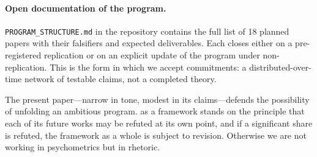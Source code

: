\paragraph{Open documentation of the program.} \texttt{PROGRAM\_STRUCTURE.md} in the repository contains the full list of 18 planned papers with their falsifiers and expected deliverables. Each closes either on a pre-registered replication or on an explicit update of the program under non-replication. This is the form in which we accept commitments: a distributed-over-time network of testable claims, not a completed theory.

The present paper---narrow in tone, modest in its claims---defends the possibility of unfolding an ambitious program. \DEIC{} as a framework stands on the principle that each of its future works may be refuted at its own point, and if a significant share is refuted, the framework as a whole is subject to revision. Otherwise we are not working in psychometrics but in rhetoric.
